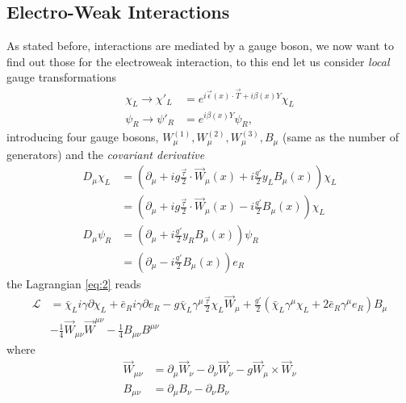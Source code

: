 \subsection{Electro-Weak Interactions}
\label{sec:electro-weak-inter}
As stated before, interactions are mediated by a gauge boson, we now want to
find out those for the electroweak interaction, to this end let us consider
\emph{local} gauge transformations
\begin{equation}
  \label{eq:11}
  \begin{split}
    \chi_{L} \rightarrow \chi'_{L} &= e^{i \vec\epsilon(x) \cdot \vec T
      + i \beta(x) Y} \chi_{L} \\
    \psi_{R} \to \psi'_{R} &= e^{i \beta(x) Y} \psi_{R},
  \end{split}
\end{equation}
introducing four gauge bosons,
$W_{\mu}^{(1)}, W_{\mu}^{(2)}, W_{\mu}^{(3)}, B_{\mu}$ (same as the number of
generators) and the \emph{covariant derivative}
\begin{equation}
  \label{eq:12}
  \begin{split}
    D_{\mu} \chi_{L} &= (\partial_{\mu} + i g \frac{\vec \tau}{2} \cdot
    \overrightarrow{W}_{\mu}(x) + i \frac{g'}{2} y_{L} B_{\mu}(x)) \chi_{L}
    \\
    &= (\partial_{\mu} + i g \frac{\vec \tau}{2}
    \cdot \overrightarrow{W}_{\mu}(x) - i \frac{g'}{2} B_{\mu}(x)) \chi_{L} \\
    D_{\mu} \psi_{R} &= (\partial_{\mu} + i \frac{g'}{2} y_{R} B_{\mu}(x))
    \psi_{R} \\
    &= (\partial_{\mu} - i \frac{g'}{2} B_{\mu}(x)) e_{R}
  \end{split}
\end{equation}
the Lagrangian \eqref{eq:2} reads
\begin{equation}
  \label{eq:13}
  \begin{split}
    \mathcal{L} &= \bar{\chi}_{L} i \gamma \partial \chi_{L} + \bar{e}_{R} i
    \gamma \partial e_{R} - g \bar{\chi}_{L} \gamma^{\mu} \frac{\vec{\tau}}{2}
    \chi_{L} \overrightarrow{W}_{\mu} + \frac{g'}{2} (\bar{\chi}_{L}
    \gamma^{\mu} \chi_{L} + 2 \bar{e}_{R} \gamma^{\mu} e_{R}) B_{\mu} \\
    &- \frac{1}{4} \overrightarrow{W}_{\mu\nu} \overrightarrow{W}^{\mu\nu} -
    \frac{1}{4} B_{\mu\nu}B^{\mu\nu}
  \end{split}
\end{equation}
where
\begin{equation}
  \label{eq:14}
  \begin{split}
    \overrightarrow{W}_{\mu\nu} &= \partial_{\mu} \overrightarrow{W}_{\nu}
    - \partial_{\nu} \overrightarrow{W}_{\nu}
    - g \overrightarrow{W}_{\mu} \times \overrightarrow{W}_{\nu} \\
    B_{\mu\nu} &= \partial_{\mu} B_{\nu} - \partial_{\nu} B_{\nu}
  \end{split}
\end{equation}
